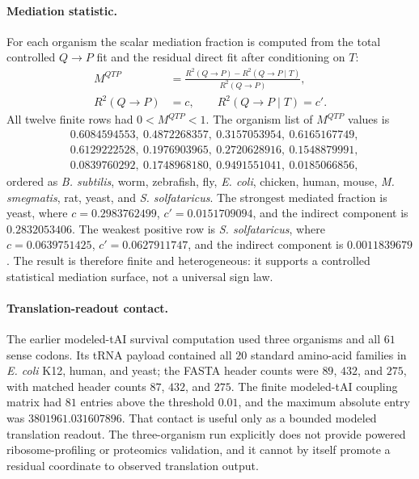 \paragraph{Mediation statistic.}
For each organism the scalar mediation fraction is computed from the total controlled $Q\to P$ fit and the residual direct fit after conditioning on $T$:
$$
\begin{aligned}
M^{QTP} &= \frac{R^2(Q\to P)-R^2(Q\to P\mid T)}{R^2(Q\to P)},\\
R^2(Q\to P) &= c,\qquad R^2(Q\to P\mid T)=c'.
\end{aligned}
$$
All twelve finite rows had $0<M^{QTP}<1$.  The organism list of $M^{QTP}$ values is
$$
\begin{aligned}
&0.6084594553,\ 0.4872268357,\ 0.3157053954,\ 0.6165167749,\\
&0.6129222528,\ 0.1976903965,\ 0.2720628916,\ 0.1548879991,\\
&0.0839760292,\ 0.1748968180,\ 0.9491551041,\ 0.0185066856,
\end{aligned}
$$
ordered as \emph{B. subtilis}, worm, zebrafish, fly, \emph{E. coli}, chicken, human, mouse, \emph{M. smegmatis}, rat, yeast, and \emph{S. solfataricus}.  The strongest mediated fraction is yeast, where $c=0.2983762499$, $c'=0.0151709094$, and the indirect component is $0.2832053406$.  The weakest positive row is \emph{S. solfataricus}, where $c=0.0639751425$, $c'=0.0627911747$, and the indirect component is $0.0011839679$.  The result is therefore finite and heterogeneous: it supports a controlled statistical mediation surface, not a universal sign law.

\paragraph{Translation-readout contact.}
The earlier modeled-tAI survival computation used three organisms and all $61$ sense codons.  Its tRNA payload contained all $20$ standard amino-acid families in \emph{E. coli} K12, human, and yeast; the FASTA header counts were $89$, $432$, and $275$, with matched header counts $87$, $432$, and $275$.  The finite modeled-tAI coupling matrix had $81$ entries above the threshold $0.01$, and the maximum absolute entry was $3801961.031607896$.  That contact is useful only as a bounded modeled translation readout.  The three-organism run explicitly does not provide powered ribosome-profiling or proteomics validation, and it cannot by itself promote a residual coordinate to observed translation output.

